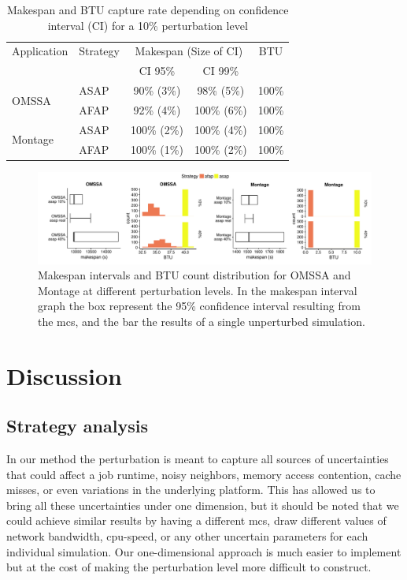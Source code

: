 \documentclass[10pt,conference,compsocconf]{IEEEtran}
\begin{document}
\begin{table}
	\centering
	\caption{Makespan and BTU capture rate depending on confidence interval
          (CI) for a 10\% perturbation level}\label{tab:fit}
	\begin{tabular}{llccc}
		\toprule
		Application&Strategy&\multicolumn{2}{c}{Makespan (Size of CI)}&BTU\\
                           &         & CI 95\% & CI 99\% &\\
		\midrule
		\multirow{2}{*}{OMSSA}&ASAP&  90\% (3\%)&  98\% (5\%)& 100\%\\
				      &AFAP&  92\% (4\%)& 100\% (6\%)& 100\%\\
		\midrule
		\multirow{2}{*}{Montage}&ASAP& 100\% (2\%)& 100\% (4\%)& 100\%\\
					&AFAP& 100\% (1\%)& 100\% (2\%)& 100\%\\
		\bottomrule
	\end{tabular}
\end{table}
\begin{figure}
	\includegraphics[width=\textwidth]{gfx/int_plot.pdf}
	\caption{Makespan intervals and BTU count distribution for OMSSA and 
	Montage at different perturbation levels. In the makespan interval graph 
	the box represent the 95\% confidence interval resulting from the \acs{mcs},
	and the bar the results of a single unperturbed simulation.}\label{fig:int}
\end{figure}


\section{Discussion}
\subsection{Strategy analysis}\label{sec:sa}

In our method the perturbation is meant to capture all sources of uncertainties
that could affect a job runtime, noisy neighbors, memory access contention,
cache misses, or even variations in the underlying platform. This has allowed us
to bring all these uncertainties under one dimension, but it should be noted that
we could achieve similar results by having a different \ac{mcs}, draw different values
of network bandwidth, cpu-speed, or any other uncertain parameters for each
individual simulation. Our one-dimensional approach is much easier to implement
but at the cost of making the perturbation level more difficult to construct.
\end{document}
